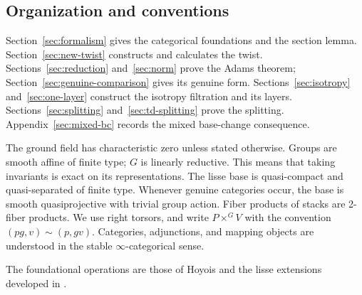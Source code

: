 \documentclass[11pt,reqno]{amsart}
\theoremstyle{definition}
\theoremstyle{remark}
\theoremstyle{plain}
\numberwithin{equation}{section}
\begin{document}
\subsection*{Organization and conventions}

Section~\ref{sec:formalism} gives the categorical foundations and
the section lemma.
Section~\ref{sec:new-twist} constructs and calculates the twist.
Sections~\ref{sec:reduction} and~\ref{sec:norm} prove the Adams theorem;
Section~\ref{sec:genuine-comparison} gives its genuine form.
Sections~\ref{sec:isotropy} and~\ref{sec:one-layer} construct the
isotropy filtration and its layers.
Sections~\ref{sec:splitting} and~\ref{sec:td-splitting} prove the splitting.
Appendix~\ref{sec:mixed-bc} records the mixed base-change consequence.

The ground field has characteristic zero unless stated otherwise.
Groups are smooth affine of finite type; \(G\) is linearly reductive.
This means that taking invariants is exact on its representations.
The lisse base is quasi-compact and quasi-separated of finite type.
Whenever genuine categories occur, the base is smooth quasiprojective
with trivial group action.
Fiber products of stacks are 2-fiber products.
We use right torsors, and write \(P\times^G V\) with the convention
\((pg,v)\sim(p,gv)\).
Categories, adjunctions, and mapping objects are understood in the
stable \(\infty\)-categorical sense.

The foundational operations are those of Hoyois \cite{Hoyois} and
the lisse extensions developed in
\cite{KhanRavi,KhanRaviStacks,ChowdhuryDAngelo,KhanLisse}.
\end{document}
